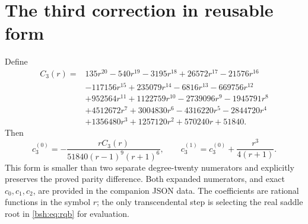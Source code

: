 \documentclass[11pt,letterpaper]{article}
\theoremstyle{remark}\newtheorem{remark}[theorem]{Remark}
\begin{document}
\section{The third correction in reusable form}\label{bsh:app:c3}
Define
\begin{align*}
 C_3(r)={}&135r^{20}-540r^{19}-3195r^{18}+26572r^{17}-21576r^{16}\\
 &-117156r^{15}+235079r^{14}-6816r^{13}-669756r^{12}\\
 &+952564r^{11}+1122759r^{10}-2739096r^9-1945791r^8\\
 &+4512672r^7+3004830r^6-4316220r^5-2844720r^4\\
 &+1356480r^3+1257120r^2+570240r+51840.
\end{align*}
Then
\[
 c_3^{(0)}=-\frac{rC_3(r)}{51840(r-1)^9(r+1)^6},\qquad
 c_3^{(1)}=c_3^{(0)}+\frac{r^3}{4(r+1)}.
\]
This form is smaller than two separate degree-twenty numerators and explicitly preserves the proved parity difference. Both expanded numerators, and exact $c_0,c_1,c_2$, are provided in the companion JSON data. The coefficients are rational functions in the symbol $r$; the only transcendental step is selecting the real saddle root in \eqref{bsh:eq:rqb} for evaluation.
\end{document}
